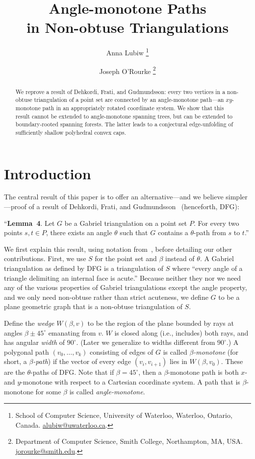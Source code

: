 \documentclass{cccg17}
\title{Angle-monotone Paths\\
in Non-obtuse Triangulations}
\author{
Anna Lubiw%
    \thanks{School of Computer Science, University of Waterloo, Waterloo, Ontario, Canada.
      \protect\url{alubiw@uwaterloo.ca}.}
\and 
Joseph O'Rourke%
    \thanks{Department of Computer Science, Smith College, Northampton, MA, USA.
      \protect\url{jorourke@smith.edu}.}
}
\newcommand{\bluenew}[1]{{#1}}  %
\newcommand{\seclab}[1]{\label{sec:#1}}
\def\b{{\beta}}
\def\q{{\theta}}
\begin{document}
\maketitle

\begin{abstract}
We reprove a 
result of Dehkordi, Frati, and Gudmundsson:
every two vertices in a non-obtuse triangulation of a point set
are connected by an angle-monotone path---an $xy$-monotone path
in an appropriately rotated coordinate system. We show that this result cannot be
extended to angle-monotone spanning trees, but can be extended to
boundary-rooted spanning forests. The latter leads to
a conjectural edge-unfolding
of sufficiently shallow polyhedral convex caps.
\end{abstract}

\section{Introduction}
\seclab{Introduction}
The central result of this paper is to offer an alternative---and we believe simpler---proof
of a result of
Dehkordi, Frati, and Gudmundsson~\cite{dfg-icgps-15} (henceforth, DFG): %
\begin{tcolorbox}
``\textbf{Lemma~4}. Let $G$ be a Gabriel triangulation on a point set $P$.
For every two points $s,t \in P$, 
there exists an angle $\q$ such that $G$ contains a $\q$-path from $s$ to $t$.''
\end{tcolorbox}
We first explain this result, using notation from~\cite{bbcklv-gtamg-16},
before detailing our other contributions.
First, we use $S$ for the point set and $\b$ instead of $\q$.
A Gabriel triangulation as defined by DFG is a triangulation of $S$ where
``every angle of a triangle delimiting an internal face is acute.''
Because neither they nor we need any of the various properties of Gabriel triangulations
except the angle property, and we only need non-obtuse rather than strict acuteness,
we define $G$ to be a plane geometric graph that is a non-obtuse triangulation of $S$.

Define the \emph{wedge} $W(\b,v)$ to be the region of
the plane 
bounded by rays at angles $\b \pm 45^\circ$ 
emanating from $v$.
$W$ is closed along (i.e., includes) both rays, and has 
angular  \emph{width} of $90^\circ$.
(Later we generalize to widths different from $90^\circ$.)
A polygonal path $(v_0,\ldots,v_k)$ \bluenew{consisting of} edges of $G$ is called \emph{$\b$-monotone}
(for short, a \emph{$\b$-path})
if the vector of every edge $(v_i, v_{i+1})$ lies in $W(\b,v_0)$.
These are the $\q$-paths of DFG.
Note that if $\b=45^\circ$, then a $\b$-monotone path is
both $x$- and $y$-monotone with respect to a Cartesian coordinate system.
A path that is $\b$-monotone for some $\b$ is called \emph{angle-monotone}.
\end{document}

